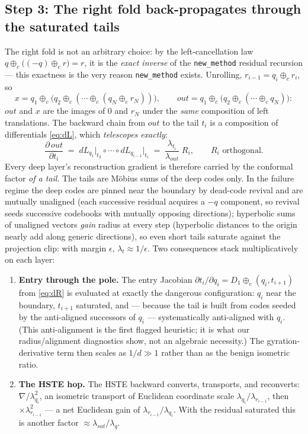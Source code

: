 \documentclass{article}
\begin{document}
\subsection*{Step 3: The right fold back-propagates through the saturated tails}
The right fold is not an arbitrary choice: by the left-cancellation law $q \oplus_c \big((-q) \oplus_c r\big) = r$, it is the \emph{exact inverse} of the \texttt{new\_method} residual recursion --- this exactness is the very reason \texttt{new\_method} exists. Unrolling, $r_{i-1} = q_i \oplus_c r_i$, so
\begin{equation}
    x = q_1 \oplus_c \big(q_2 \oplus_c ( \cdots \oplus_c (q_N \oplus_c r_N))\big),
    \qquad
    out = q_1 \oplus_c \big(q_2 \oplus_c ( \cdots \oplus_c q_N)\big):
\end{equation}
$out$ and $x$ are the images of $0$ and $r_N$ under the \emph{same} composition of left translations. The backward chain from $out$ to the tail $t_i$ is a composition of differentials \eqref{eq:dL}, which \emph{telescopes exactly}:
\begin{equation}\label{eq:telescope}
    \frac{\partial\, out}{\partial t_i} \;=\; dL_{q_1}\big|_{t_2} \circ \cdots \circ dL_{q_{i-1}}\big|_{t_i}
    \;=\; \frac{\lambda_{t_i}}{\lambda_{out}}\; R_i, \qquad R_i \text{ orthogonal.}
\end{equation}
Every deep layer's reconstruction gradient is therefore carried by the conformal factor \emph{of a tail}. The tails are M\"obius sums of the deep codes only. In the failure regime the deep codes are pinned near the boundary by dead-code revival and are mutually unaligned (each successive residual acquires a $-q$ component, so revival seeds successive codebooks with mutually opposing directions); hyperbolic sums of unaligned vectors \emph{gain} radius at every step (hyperbolic distances to the origin nearly add along generic directions), so even short tails saturate against the projection clip: with margin $\epsilon$, $\lambda_{t} \approx 1/\epsilon$. Two consequences stack multiplicatively on each layer:
\begin{enumerate}
    \item \textbf{Entry through the pole.} The entry Jacobian $\partial t_i / \partial q_i = D_1 \oplus_c (q_i, t_{i+1})$ from \eqref{eq:dR} is evaluated at exactly the dangerous configuration: $q_i$ near the boundary, $t_{i+1}$ saturated, and --- because the tail is built from codes seeded by the anti-aligned successors of $q_i$ --- systematically anti-aligned with $q_i$. (This anti-alignment is the first flagged heuristic; it is what our radius/alignment diagnostics show, not an algebraic necessity.) The gyration-derivative term then scales as $1/d \gg 1$ rather than as the benign isometric ratio.
    \item \textbf{The HSTE hop.} The HSTE backward converts, transports, and reconverts: $\nabla / \lambda_{q_i}^2$, an isometric transport of Euclidean coordinate scale $\lambda_{q_i}/\lambda_{r_{i-1}}$, then $\times \lambda_{r_{i-1}}^2$ --- a net Euclidean gain of $\lambda_{r_{i-1}}/\lambda_{q_i}$. With the residual saturated this is another factor $\approx \lambda_{sat}/\lambda_q$.
\end{enumerate}
\end{document}

